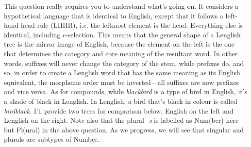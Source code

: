 \documentclass[a4paper,12pt]{article}
\begin{document}
\noindent{}\par
\noindent This question really requires you to understand what's going on. It considers a hypothetical language that is identical to English, except that it follows a left-hand head rule (LHHR), i.e. the leftmost element is the head. Everything else is identical, including c-selection. This means that the general shape of a Lenglish tree is the mirror image of English, because the element on the left is the one that determines the category and core meaning of the resultant word. In other words, suffixes will never change the category of the stem, while prefixes do, and so, in order to create a Lenglish word that has the same meaning as its English equivalent, the morpheme order must be inverted---all suffixes are now prefixes and vice versa. As for compounds, while \textit{blackbird} is a type of bird in English, it's a shade of black in Lenglish. In Lenglish, a bird that's black in colour is called \textit{birdblack}. I'll provide two trees for comparison below, English on the left and Lenglish on the right. Note also that the plural \textit{-s} is labelled as Num(ber) here but Pl(ural) in the above question. As we progress, we will see that singular and plurals are subtypes of Number.
\end{document}
